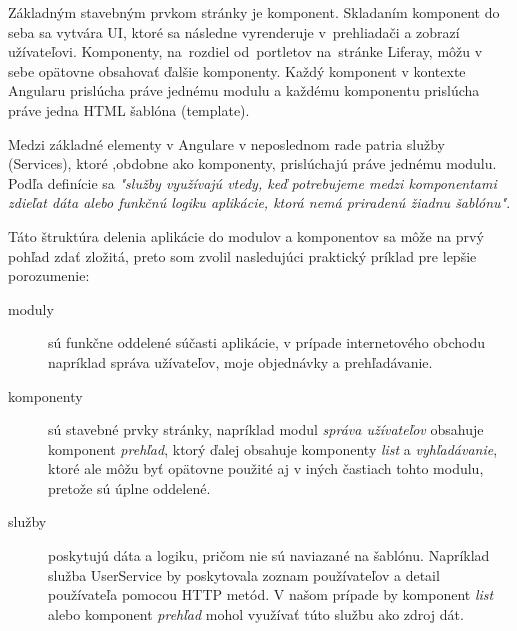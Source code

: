 \documentclass[
  digital, %
  twoside, %
  notable,   %
  nolof,   %
  nolot,   %
]{fithesis3}
\begin{document}
Základným stavebným prvkom stránky je komponent. Skladaním komponent do seba sa vytvára UI, ktoré sa následne vyrenderuje v~prehliadači a zobrazí užívateľovi. Komponenty, na~rozdiel od~portletov na~stránke Liferay, môžu v sebe opätovne obsahovať ďalšie komponenty. Každý komponent v kontexte Angularu prislúcha práve jednému modulu a každému komponentu prislúcha práve jedna HTML šablóna (template).

Medzi základné elementy v Angulare v neposlednom rade patria služby (Services), ktoré ,obdobne ako komponenty, prislúchajú práve jednému modulu. Podľa definície sa \textit{"služby využívajú vtedy, keď potrebujeme medzi komponentami zdieľat dáta alebo funkčnú logiku aplikácie, ktorá nemá priradenú žiadnu šablónu"}\cite{angular}.

Táto štruktúra delenia aplikácie do modulov a komponentov sa môže na prvý pohľad zdať zložitá, preto som zvolil nasledujúci praktický príklad pre lepšie porozumenie:
\begin{description}
\item[moduly] sú funkčne oddelené súčasti aplikácie, v prípade internetového obchodu napríklad správa užívateľov, moje objednávky a prehľadávanie.
\item[komponenty] sú stavebné prvky stránky, napríklad modul \textit{správa užívateľov} obsahuje komponent \textit{prehľad}, ktorý ďalej obsahuje komponenty \textit{list} a \textit{vyhľadávanie}, ktoré ale môžu byť opätovne použité aj v iných častiach tohto modulu, pretože sú úplne oddelené.
\item[služby] poskytujú dáta a logiku, pričom nie sú naviazané na šablónu. Napríklad služba UserService by poskytovala zoznam používateľov a detail používateľa pomocou HTTP metód. V našom prípade by komponent \textit{list} alebo komponent \textit{prehľad} mohol využívať túto službu ako zdroj dát.
\end{description}
\end{document}
